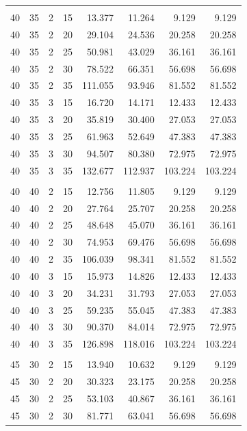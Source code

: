 \documentclass{article}
\begin{document}
\begin{longtable}{rrrrrrrr}
\addlinespace
\multicolumn{8}{l}{\textbf{$\theta_1=40^\circ$, $\theta_2=35^\circ$}} \\
40 & 35 & 2 & 15 & 13.377 & 11.264 & 9.129 & 9.129 \\
40 & 35 & 2 & 20 & 29.104 & 24.536 & 20.258 & 20.258 \\
40 & 35 & 2 & 25 & 50.981 & 43.029 & 36.161 & 36.161 \\
40 & 35 & 2 & 30 & 78.522 & 66.351 & 56.698 & 56.698 \\
40 & 35 & 2 & 35 & 111.055 & 93.946 & 81.552 & 81.552 \\
40 & 35 & 3 & 15 & 16.720 & 14.171 & 12.433 & 12.433 \\
40 & 35 & 3 & 20 & 35.819 & 30.400 & 27.053 & 27.053 \\
40 & 35 & 3 & 25 & 61.963 & 52.649 & 47.383 & 47.383 \\
40 & 35 & 3 & 30 & 94.507 & 80.380 & 72.975 & 72.975 \\
40 & 35 & 3 & 35 & 132.677 & 112.937 & 103.224 & 103.224 \\
\addlinespace
\multicolumn{8}{l}{\textbf{$\theta_1=40^\circ$, $\theta_2=40^\circ$}} \\
40 & 40 & 2 & 15 & 12.756 & 11.805 & 9.129 & 9.129 \\
40 & 40 & 2 & 20 & 27.764 & 25.707 & 20.258 & 20.258 \\
40 & 40 & 2 & 25 & 48.648 & 45.070 & 36.161 & 36.161 \\
40 & 40 & 2 & 30 & 74.953 & 69.476 & 56.698 & 56.698 \\
40 & 40 & 2 & 35 & 106.039 & 98.341 & 81.552 & 81.552 \\
40 & 40 & 3 & 15 & 15.973 & 14.826 & 12.433 & 12.433 \\
40 & 40 & 3 & 20 & 34.231 & 31.793 & 27.053 & 27.053 \\
40 & 40 & 3 & 25 & 59.235 & 55.045 & 47.383 & 47.383 \\
40 & 40 & 3 & 30 & 90.370 & 84.014 & 72.975 & 72.975 \\
40 & 40 & 3 & 35 & 126.898 & 118.016 & 103.224 & 103.224 \\
\addlinespace
\multicolumn{8}{l}{\textbf{$\theta_1=45^\circ$, $\theta_2=30^\circ$}} \\
45 & 30 & 2 & 15 & 13.940 & 10.632 & 9.129 & 9.129 \\
45 & 30 & 2 & 20 & 30.323 & 23.175 & 20.258 & 20.258 \\
45 & 30 & 2 & 25 & 53.103 & 40.867 & 36.161 & 36.161 \\
45 & 30 & 2 & 30 & 81.771 & 63.041 & 56.698 & 56.698 \\

\end{longtable}
\end{document}
